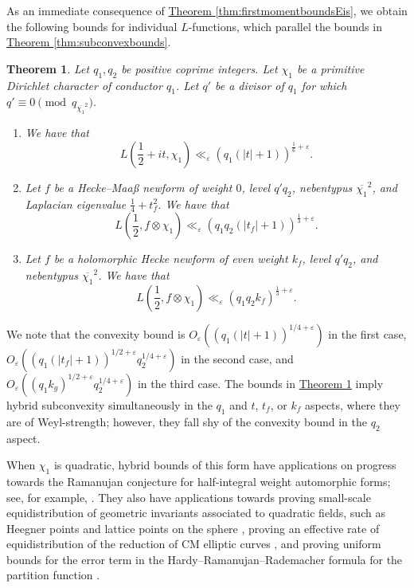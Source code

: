 \documentclass[11pt,a4paper]{amsart}
\newcommand{\e}{\varepsilon}
\numberwithin{equation}{section}
\newtheorem{theorem}[equation]{Theorem}
\theoremstyle{remark}
\theoremstyle{definition}
\begin{document}
As an immediate consequence of \hyperref[thm:firstmomentboundsEis]{Theorem \ref*{thm:firstmomentboundsEis}}, we obtain the following bounds for individual $L$-functions, which parallel the bounds in \hyperref[thm:subconvexbounds]{Theorem \ref*{thm:subconvexbounds}}.

\begin{theorem}
\label{thm:subconvexboundsEis}
Let $q_1,q_2$ be positive coprime integers. Let $\chi_1$ be a primitive Dirichlet character of conductor $q_1$. Let $q'$ be a divisor of $q_1$ for which $q' \equiv 0 \pmod{q_{\overline{\chi_1}^2}}$.
\begin{enumerate}[leftmargin=*,label=\textup{(\arabic*)}]
\item\label{thmno:subconvexboundsEis1} We have that
\[L\left(\frac{1}{2} + it, \chi_1\right) \ll_{\e} (q_1(|t| + 1))^{\frac{1}{6} + \e}.\]
\item\label{thmno:subconvexboundsEis2} Let $f$ be a Hecke--Maa\ss{} newform of weight $0$, level $q' q_2$, nebentypus $\overline{\chi_1}^2$, and Laplacian eigenvalue $\frac{1}{4} + t_f^2$. We have that
\[L\left(\frac{1}{2},f \otimes \chi_1\right) \ll_{\e} (q_1 q_2 (|t_f| + 1))^{\frac{1}{3} + \e}.\]
\item\label{thmno:subconvexboundsEis3} Let $f$ be a holomorphic Hecke newform of even weight $k_f$, level $q' q_2$, and nebentypus $\overline{\chi_1}^2$. We have that
\[L\left(\frac{1}{2},f \otimes \chi_1\right) \ll_{\e} (q_1 q_2 k_f)^{\frac{1}{3} + \e}.\]
\end{enumerate}
\end{theorem}

We note that the convexity bound is $O_{\e}((q_1(|t| + 1))^{1/4 + \e})$ in the first case, $O_{\e}((q_1 (|t_f| + 1))^{1/2 + \e} q_2^{1/4 + \e})$ in the second case, and $O_{\e}((q_1 k_g)^{1/2 + \e} q_2^{1/4 + \e})$ in the third case. The bounds in \hyperref[thm:subconvexboundsEis]{Theorem \ref*{thm:subconvexboundsEis}} imply hybrid subconvexity simultaneously in the $q_1$ and $t$, $t_f$, or $k_f$ aspects, where they are of Weyl-strength; however, they fall shy of the convexity bound in the $q_2$ aspect.

When $\chi_1$ is quadratic, hybrid bounds of this form have applications on progress towards the Ramanujan conjecture for half-integral weight automorphic forms; see, for example, \cite[Theorem 2]{PY19}. They also have applications towards proving small-scale equidistribution of geometric invariants associated to quadratic fields, such as Heegner points \cite[Section 2]{You17} and lattice points on the sphere \cite[Theorem 1.5]{HR22}, proving an effective rate of equidistribution of the reduction of CM elliptic curves \cite[Theorem 1.1]{LMY15}, and proving uniform bounds for the error term in the Hardy--Ramanujan--Rademacher formula for the partition function \cite[Theorem 1.1]{AW23}.
\end{document}
